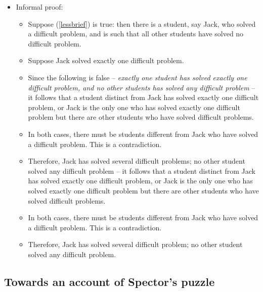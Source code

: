 \documentclass[landscape,twocolumn,cronos,paper=letter]{ling-handout}
\begin{document}
\begin{itemize}
  \item Informal proof:

    \begin{itemize}

        \item  Suppose (\ref{lessbrief}) is true: then there is a student, say
        Jack, who solved a difficult problem, and is such that all other
        students have solved no difficult problem.

      \item Suppose Jack solved exactly one difficult problem.

        \item Since the following is false -- \textit{exactly one student has
        solved exactly one difficult problem, and no other students has solved
        any difficult problem} -- it follows that a student distinct from Jack
        has solved exactly one difficult problem, or Jack is the only one who
        has solved exactly one difficult problem but there are other students
        who have solved difficult problems.

      \item In both cases, there must be students different from Jack who have
        solved a difficult problem. This is a contradiction.

      \item Therefore, Jack has solved several difficult problems; no other
        student solved any difficult problem -- it follows that a student
        distinct from Jack has solved exactly one difficult problem, or Jack is
        the only one who has solved exactly one difficult problem but there are
        other students who have solved difficult problems.

      \item In both cases, there must be students different from Jack who have
        solved a difficult problem. This is a contradiction.

      \item Therefore, Jack has solved several difficult problem; no other
        student solved any difficult problem.

     \end{itemize}

\end{itemize}

\subsection{Towards an account of Spector's puzzle}
\end{document}
